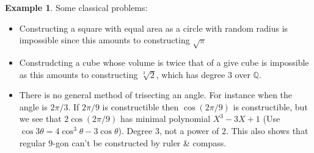 \documentclass{article}
\theoremstyle{definition}
\newtheorem{example}[defn]{Example}
\theoremstyle{remark}
\theoremstyle{plain}
\newcommand{\QQ}{\mathbb{Q}}
\begin{document}
\begin{enumerate}
\begin{example}
    Some classical problems:
    \begin{itemize}
        \item Constructing a square with equal area as a circle with random radius is impossible since this amounts to constructing $\sqrt{\pi}$
        \item Construdcting a cube whose volume is twice that of a give cube is impossible as this amounts to constructing $\sqrt[3]{2}$, which has degree $3$ over $\QQ$.
        \item There is no general method of trisecting an angle. For instance when the angle is $2\pi/3$. If $2\pi/9$ is constructible then $\cos(2\pi/9)$ is constructible, but we see that $2\cos(2\pi/9)$ has minimal polynomial $X^3-3X+1$ (Use $\cos3\theta=4\cos^3\theta-3\cos\theta$). Degree $3$, not a power of $2$. This also shows that regular $9$-gon can't be constructed by ruler \& compass.
    \end{itemize}
\end{example}

\end{enumerate}
\end{document}
